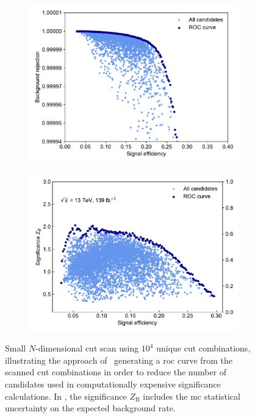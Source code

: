  \begin{figure}
	\centering
	\begin{subfigure}[b]{0.5\linewidth}
		\centering\includegraphics[width=1.0\textwidth]{N-1_cut_scan/roc_curve_thesis_plots}
		\caption{\label{fig:roc_curve}}
	\end{subfigure}\hfill
	\begin{subfigure}[b]{0.5\linewidth}
		\centering\includegraphics[width=1.0\textwidth]{N-1_cut_scan/z_vs_effs_thesis_plots}
		\caption{\label{fig:z_vs_eff}}
	\end{subfigure}\hfill

	\caption{Small $N$-dimensional cut scan using $10^4$ unique cut combinations, illustrating the approach of~ generating a \gls{roc} curve from the scanned cut combinations in order to  reduce the number of candidates used in computationally expensive significance calculations. In , the significance $Z_\mathrm{B}$ includes the \gls{mc} statistical uncertainty on the expected background rate.} 
	\label{fig:ahoi_examples}
\end{figure}


